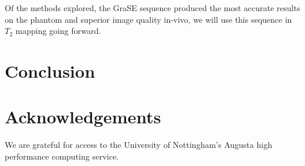 Of the methods explored, the \ac{GraSE} sequence produced the most accurate results on the phantom and superior image quality in-vivo, we will use this sequence in $T_2$ mapping going forward.

\section{Conclusion}

\section{Acknowledgements}

We are grateful for access to the University of Nottingham's Augusta high performance computing service.
